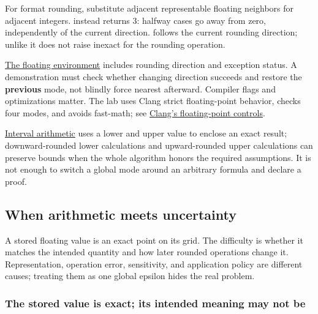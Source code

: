 For format rounding, substitute adjacent representable floating neighbors for adjacent integers.  instead returns 3: halfway cases go away from zero, independently of the current direction.  follows the current rounding direction; unlike  it does not raise inexact for the rounding operation.

\hyperref[appendix-f11d1a521253]{The floating environment} includes rounding direction and exception status. A demonstration must check whether changing direction succeeds and restore the \textbf{previous} mode, not blindly force nearest afterward. Compiler flags and optimizations matter. The lab uses Clang strict floating-point behavior, checks four modes, and avoids fast-math; see \href{https://clang.llvm.org/docs/UsersManual.html\#controlling-floating-point-behavior}{Clang's floating-point controls}.

\hyperref[appendix-1823a14330cb]{Interval arithmetic} uses a lower and upper value to enclose an exact result; downward-rounded lower calculations and upward-rounded upper calculations can preserve bounds when the whole algorithm honors the required assumptions. It is not enough to switch a global mode around an arbitrary formula and declare a proof.

\subsection{When arithmetic meets uncertainty}\label{01-foundations-i-ch001-when-arithmetic-meets-uncertainty}

\hypertarget{01-foundations-i-ch001-when-arithmetic-meets-uncertainty}{}

A stored floating value is an exact point on its grid. The difficulty is whether it matches the intended quantity and how later rounded operations change it. Representation, operation error, sensitivity, and application policy are different causes; treating them as one global epsilon hides the real problem.

\subsubsection{The stored value is exact; its intended meaning may not be}\label{01-foundations-i-ch001-the-stored-value-is-exact-its-intended-meaning-may-not-be}

\hypertarget{01-foundations-i-ch001-the-stored-value-is-exact-its-intended-meaning-may-not-be}{}

